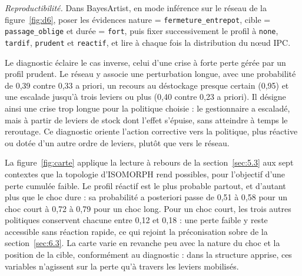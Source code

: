 \begin{center}

\label{fig:d7}
\end{center}

\textit{Reproductibilité.} Dans BayesArtist, en mode inférence sur le réseau de la figure~\ref{fig:d6}, poser les évidences nature = \texttt{fermeture\_entrepot}, cible = \texttt{passage\_oblige} et durée = \texttt{fort}, puis fixer successivement le profil à \texttt{none}, \texttt{tardif}, \texttt{prudent} et \texttt{reactif}, et lire à chaque fois la distribution du nœud IPC.

Le diagnostic éclaire le cas inverse, celui d'une crise à forte perte gérée par un profil prudent. Le réseau y associe une perturbation longue, avec une probabilité de 0,39 contre 0,33 a priori, un recours au déstockage presque certain (0,95) et une escalade jusqu'à trois leviers ou plus (0,40 contre 0,23 a priori). Il désigne ainsi une crise trop longue pour la politique choisie : le gestionnaire a escaladé, mais à partir de leviers de stock dont l'effet s'épuise, sans atteindre à temps le reroutage. Ce diagnostic oriente l'action corrective vers la politique, plus réactive ou dotée d'un autre ordre de leviers, plutôt que vers le réseau.

La figure~\ref{fig:carte} applique la lecture à rebours de la section~\ref{sec:5.3} aux sept contextes que la topologie d'ISOMORPH rend possibles, pour l'objectif d'une perte cumulée faible. Le profil réactif est le plus probable partout, et d'autant plus que le choc dure : sa probabilité a posteriori passe de 0,51 à 0,58 pour un choc court à 0,72 à 0,79 pour un choc long. Pour un choc court, les trois autres politiques conservent chacune entre 0,12 et 0,18 : une perte faible y reste accessible sans réaction rapide, ce qui rejoint la préconisation sobre de la section~\ref{sec:6.3}. La carte varie en revanche peu avec la nature du choc et la position de la cible, conformément au diagnostic : dans la structure apprise, ces variables n'agissent sur la perte qu'à travers les leviers mobilisés.

\begin{center}
\begin{minipage}{\textwidth}\centering

\label{fig:carte}
\end{minipage}
\end{center}

